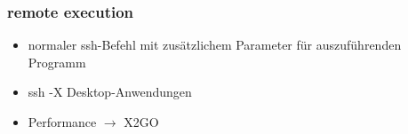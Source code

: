 \begin{frame}
\frametitle{remote execution}
\begin{itemize}
\item normaler ssh-Befehl mit zusätzlichem Parameter für auszuführenden Programm
\item ssh -X Desktop-Anwendungen
\item Performance $\rightarrow$ X2GO
\end{itemize}
\end{frame}